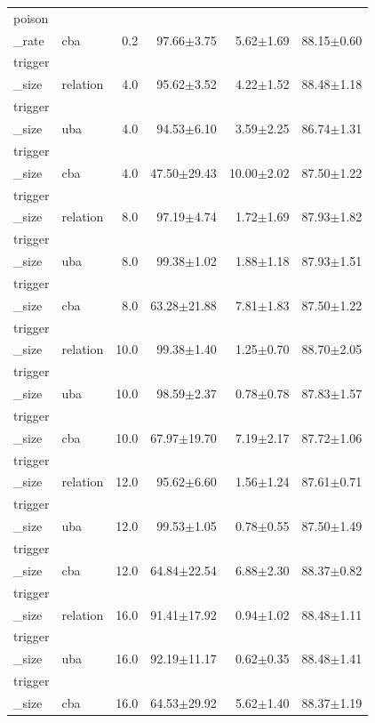 \begin{table}[t]
\begin{tabular}{llrrrr}
poison\\_rate & cba & 0.2 & 97.66$\pm$3.75 & 5.62$\pm$1.69 & 88.15$\pm$0.60 \\
trigger\\_size & relation & 4.0 & 95.62$\pm$3.52 & 4.22$\pm$1.52 & 88.48$\pm$1.18 \\
trigger\\_size & uba & 4.0 & 94.53$\pm$6.10 & 3.59$\pm$2.25 & 86.74$\pm$1.31 \\
trigger\\_size & cba & 4.0 & 47.50$\pm$29.43 & 10.00$\pm$2.02 & 87.50$\pm$1.22 \\
trigger\\_size & relation & 8.0 & 97.19$\pm$4.74 & 1.72$\pm$1.69 & 87.93$\pm$1.82 \\
trigger\\_size & uba & 8.0 & 99.38$\pm$1.02 & 1.88$\pm$1.18 & 87.93$\pm$1.51 \\
trigger\\_size & cba & 8.0 & 63.28$\pm$21.88 & 7.81$\pm$1.83 & 87.50$\pm$1.22 \\
trigger\\_size & relation & 10.0 & 99.38$\pm$1.40 & 1.25$\pm$0.70 & 88.70$\pm$2.05 \\
trigger\\_size & uba & 10.0 & 98.59$\pm$2.37 & 0.78$\pm$0.78 & 87.83$\pm$1.57 \\
trigger\\_size & cba & 10.0 & 67.97$\pm$19.70 & 7.19$\pm$2.17 & 87.72$\pm$1.06 \\
trigger\\_size & relation & 12.0 & 95.62$\pm$6.60 & 1.56$\pm$1.24 & 87.61$\pm$0.71 \\
trigger\\_size & uba & 12.0 & 99.53$\pm$1.05 & 0.78$\pm$0.55 & 87.50$\pm$1.49 \\
trigger\\_size & cba & 12.0 & 64.84$\pm$22.54 & 6.88$\pm$2.30 & 88.37$\pm$0.82 \\
trigger\\_size & relation & 16.0 & 91.41$\pm$17.92 & 0.94$\pm$1.02 & 88.48$\pm$1.11 \\
trigger\\_size & uba & 16.0 & 92.19$\pm$11.17 & 0.62$\pm$0.35 & 88.48$\pm$1.41 \\
trigger\\_size & cba & 16.0 & 64.53$\pm$29.92 & 5.62$\pm$1.40 & 88.37$\pm$1.19 \\

\end{tabular}
\end{table}
